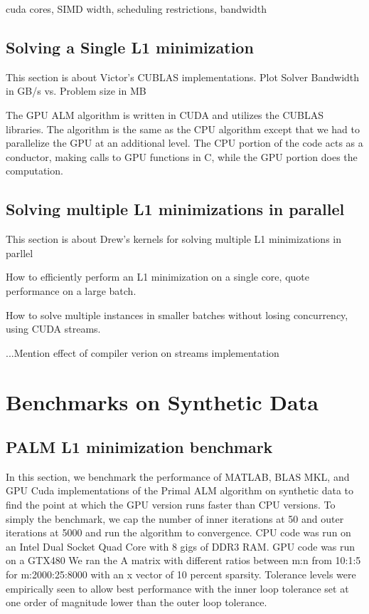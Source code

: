 \documentclass[10pt,twocolumn,letterpaper]{article}
\begin{document}
cuda cores, SIMD width, scheduling restrictions, bandwidth
\subsection{Solving a Single L1 minimization}
This section is about Victor's CUBLAS implementations.
Plot Solver Bandwidth in GB/s vs. Problem size in MB

The GPU ALM algorithm is written in CUDA and utilizes the CUBLAS libraries.  The algorithm is the same as the CPU algorithm except that we had to parallelize the GPU at an additional level.  The CPU portion of the code acts as a conductor, making calls to GPU functions in C, while the GPU portion does the computation.

\subsection{Solving multiple L1 minimizations in parallel}
This section is about Drew's kernels for solving multiple L1 minimizations in parllel

How to efficiently perform an L1 minimization on a single core, quote performance on a large batch.

How to solve multiple instances in smaller batches without losing concurrency, using CUDA streams.

...Mention effect of compiler verion on streams implementation

\section{Benchmarks on Synthetic Data}
\subsection{PALM L1 minimization benchmark}

In this section, we benchmark the performance of MATLAB, BLAS MKL, and GPU Cuda implementations of the Primal ALM algorithm on synthetic data to find the point at which the GPU version runs faster than CPU versions.
To simply the benchmark, we cap the number of inner iterations at 50 and outer iterations at 5000 and run the algorithm to convergence.
CPU code was run on an Intel Dual Socket Quad Core with 8 gigs of DDR3 RAM.  GPU code was run on a GTX480
We ran the A matrix with different ratios between m:n from 10:1:5 for m:2000:25:8000 with an x vector of 10 percent sparsity.  Tolerance levels were empirically seen to allow best performance with the inner loop tolerance set at one order of magnitude lower than the outer loop tolerance.
\end{document}

